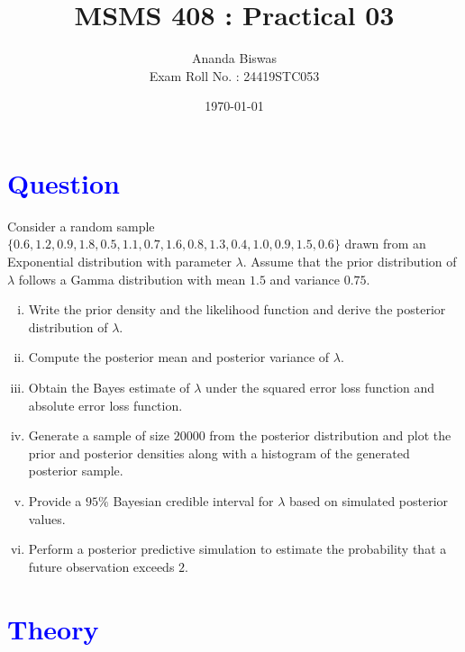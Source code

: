 \documentclass[11pt, a4paper]{article}\usepackage[]{graphicx}\usepackage[]{xcolor}
\title{MSMS 408 : Practical 03}
\author{{\fontsize{22}{20} \benyorithafont Ananda Biswas} \\[1em] Exam Roll No. : 24419STC053}
\date{\today}
\begin{document}
\maketitle


\section*{\faArrowAltCircleRight[regular] \textcolor{blue}{Question}}

\hspace{1cm} Consider a random sample $\{0.6, 1.2, 0.9, 1.8, 0.5, 1.1, 0.7, 1.6, 0.8, 1.3, 0.4, 1.0, 0.9, 1.5, 0.6\}$ drawn from an Exponential distribution with parameter $\lambda$. Assume that the prior distribution of $\lambda$ follows a Gamma distribution with mean $1.5$ and variance $0.75$.

\begin{enumerate}[(i)]
\item Write the prior density and the likelihood function and derive the posterior distribution of $\lambda$.

\item Compute the posterior mean and posterior variance of $\lambda$.

\item Obtain the Bayes estimate of $\lambda$ under the squared error loss function and absolute error loss function.

\item Generate a sample of size $20000$ from the posterior distribution and plot the prior and posterior densities along with a histogram of the generated posterior sample.

\item Provide a $95\%$ Bayesian credible interval for $\lambda$ based on simulated posterior values.

\item Perform a posterior predictive simulation to estimate the probability that a future observation exceeds $2$.
\end{enumerate}

\section*{\faArrowAltCircleRight[regular] \textcolor{blue}{Theory}}
\end{document}
